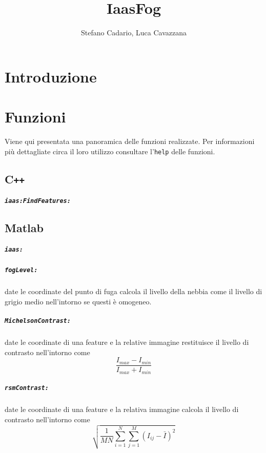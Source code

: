 \documentclass[12pt]{report}
\title {IaasFog}
\author{Stefano Cadario, Luca Cavazzana}
\begin{document}
\maketitle

\tableofcontents

\chapter{Introduzione}

\chapter{Funzioni}

Viene qui presentata una panoramica delle funzioni realizzate. Per informazioni pi\`u dettagliate circa il loro utilizzo consultare l'\verb|help| delle funzioni.

\section[C++]{C\verb_++_}

\paragraph*{\verb_iaas:FindFeatures:_}

\section{Matlab}

\paragraph*{\verb_iaas:_}

\paragraph*{\verb_fogLevel:_} date le coordinate del punto di fuga calcola il livello della nebbia come il livello di grigio medio nell'intorno se questi \`e omogeneo.

\paragraph*{\verb_MichelsonContrast:_} date le coordinate di una feature e la relative immagine restituisce il livello di contrasto nell'intorno come $$\frac{I_{max}-I_{min}}{I_{max}+I_{min}}$$
\paragraph*{\verb_rsmContrast:_} date le coordinate di una feature e la relativa immagine calcola il livello di contrasto nell'intorno come $$\sqrt{\frac{1}{MN}\sum_{i=1}^N\sum_{j=1}^M(I_{ij}-\bar{I})^2}$$
\end{document}
